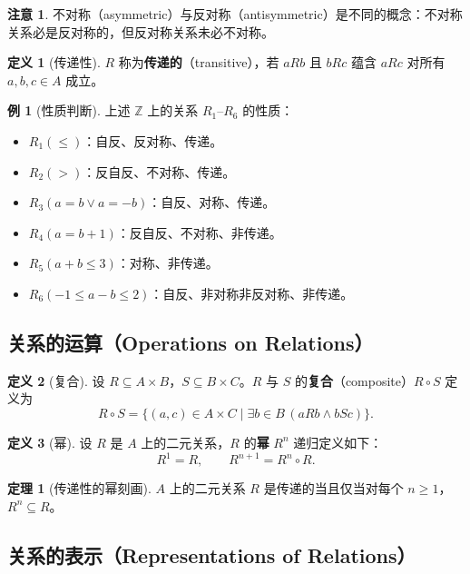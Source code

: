 \documentclass[UTF8,11pt,a4paper]{ctexbook}   %
\theoremstyle{definition}
\newtheorem{definition}{定义}[section]
\newtheorem{theorem}{定理}[section]
\newtheorem{example}{例}[section]
\newtheorem{warning}{注意}[section]
\begin{document}
\begin{warning}
不对称（asymmetric）与反对称（antisymmetric）是不同的概念：不对称关系必是反对称的，但反对称关系未必不对称。
\end{warning}

\begin{definition}[传递性]
$R$ 称为\textbf{传递的}（transitive），若 $a R b$ 且 $b R c$ 蕴含 $a R c$ 对所有 $a,b,c \in A$ 成立。
\end{definition}

\begin{example}[性质判断]
上述 $\mathbb{Z}$ 上的关系 $R_1$–$R_6$ 的性质：
\begin{itemize}
    \item $R_1(\leq)$：自反、反对称、传递。
    \item $R_2(>)$：反自反、不对称、传递。
    \item $R_3(a=b \lor a=-b)$：自反、对称、传递。
    \item $R_4(a=b+1)$：反自反、不对称、非传递。
    \item $R_5(a+b \leq 3)$：对称、非传递。
    \item $R_6(-1 \leq a-b \leq 2)$：自反、非对称非反对称、非传递。
\end{itemize}
\end{example}

\subsection{关系的运算（Operations on Relations）}

\begin{definition}[复合]
设 $R \subseteq A \times B$，$S \subseteq B \times C$。$R$ 与 $S$ 的\textbf{复合}（composite）$R \circ S$ 定义为
\[
R \circ S = \{(a,c) \in A \times C \mid \exists b \in B\, (a R b \land b S c)\}.
\]
\end{definition}

\begin{definition}[幂]
设 $R$ 是 $A$ 上的二元关系，$R$ 的\textbf{幂} $R^n$ 递归定义如下：
\[
R^1 = R,\qquad R^{n+1} = R^n \circ R.
\]
\end{definition}

\begin{theorem}[传递性的幂刻画]
$A$ 上的二元关系 $R$ 是传递的当且仅当对每个 $n \geq 1$，$R^n \subseteq R$。
\end{theorem}

\subsection{关系的表示（Representations of Relations）}
\end{document}
